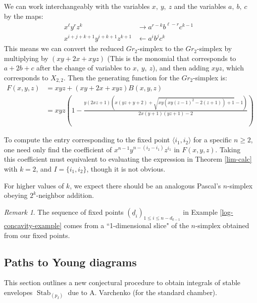 \documentclass[12 pt]{article}
\theoremstyle{plain}
\theoremstyle{plain}
\theoremstyle{plain}
\theoremstyle{plain}
\theoremstyle{plain}
\theoremstyle{plain}
\theoremstyle{plain}
\theoremstyle{plain}
\theoremstyle{plain}
\theoremstyle{plain}
\theoremstyle{remark}
\newtheorem{remark}{Remark}[section]
\theoremstyle{remark}
\theoremstyle{definition}
\theoremstyle{definition}
\theoremstyle{definition}
\theoremstyle{definition}
\theoremstyle{definition}
\theoremstyle{definition}
\DeclareMathOperator{\stab}{\text{Stab}}
\begin{document}
We can work interchangeably with the variables $x,\ y,\ z$ and the variables $a,\ b,\ c$ by the maps:
\begin{align*}
x^\ell y^r z^k &\rightarrow a^{r-k}b^{\ell-r}c^{k-1}\\
x^{i+j+k+1}y^{i+k+1}z^{k+1} &\leftarrow a^ib^jc^k
\end{align*}
This means we can convert the reduced $Gr_{2}$-simplex to the $Gr_{2}$-simplex by multiplying by $(xy+2x+xyz)$ (This is the monomial that corresponds to $a+2b+c$ after the change of variables to $x,\ y,\ z$), and then adding $xyz$, which corresponds to $X_{2,2}$. Then the generating function for the $Gr_{2}$-simplex is:
\begin{align*}
F(x,y,z) &= xyz + (xy+2x+xyz)B(x,y,z)\\
&= x y z \left(1-\frac{y (2 x z+1) \left(x (y z+y+2)+\sqrt{x y \left(x y (z-1)^2-2 (z+1)\right)+1}-1\right)}{2 x (y+1) (y z+1)-2}\right)
\end{align*}

To compute the entry corresponding to the fixed point $\langle i_1,i_2 \rangle$ for a specific $n \geq 2$, one need only find the coefficient of $x^{n-1}y^{n-(i_2-i_1)}z^{i_1}$ in $F(x,y,z)$. Taking this coefficient must equivalent to evaluating the expression in Theorem \ref{lim-calc} with $k = 2$, and $I = \{i_1,i_2\}$, though it is not obvious.

For higher values of $k$, we expect there should be an analogous Pascal's $n$-simplex obeying $2^k$-neighbor addition. 
\begin{remark}\label{remk-slice}
The sequence of fixed points $(\underline{d}_{i})_{1\leq i\leq n-d_{k-1}}$ in Example \ref{log-concavity-example} comes from a ``1-dimensional slice" of the $n$-simplex obtained from our fixed points.
\end{remark}
\subsection{Paths to Young diagrams}\label{var-path}

This section outlines a new conjectural procedure to obtain integrals of stable envelopes $\stab_(p_{I})$ due to A. Varchenko (for the standard chamber). 
\end{document}
